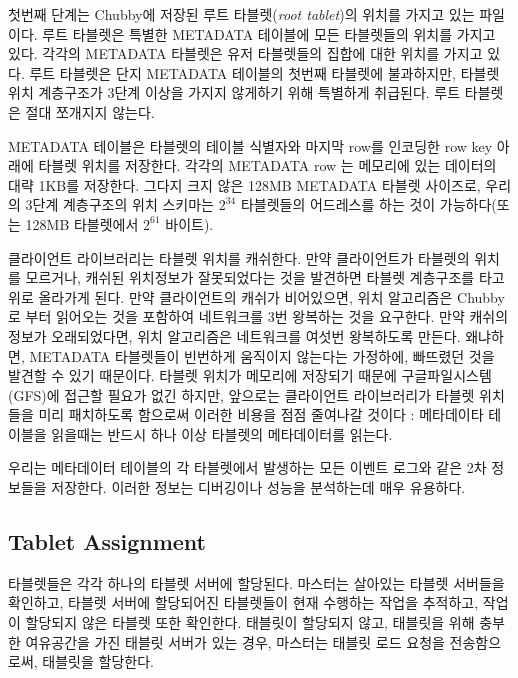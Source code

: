 \documentclass[twocolumn]{article}
\begin{document}
 첫번째 단계는 Chubby에 저장된 루트 타블렛(\textit{root tablet})의 위치를 가지고 있는 파일이다. 루트 타블렛은 특별한 METADATA 테이블에 모든 타블렛들의 위치를 가지고 있다. 각각의 METADATA 타블렛은 유저 타블렛들의 집합에 대한 위치를 가지고 있다. 루트 타블렛은 단지 METADATA 테이블의 첫번째 타블렛에 불과하지만, 타블렛 위치 계층구조가 3단계 이상을 가지지 않게하기 위해 특별하게 취급된다. 루트 타블렛은 절대 쪼개지지 않는다.

METADATA 테이블은 타블렛의 테이블 식별자와 마지막 row를 인코딩한 row key 아래에 타블렛 위치를 저장한다. 각각의 METADATA row 는 메모리에 있는 데이터의 대략 1KB를 저장한다. 그다지 크지 않은 128MB METADATA 타블렛 사이즈로, 우리의 3단계 계층구조의 위치 스키마는 $2^{34}$ 타블렛들의 어드레스를 하는 것이 가능하다(또는 128MB 타블렛에서 $2^{61}$ 바이트).

클라이언트 라이브러리는 타블렛 위치를 캐쉬한다. 만약 클라이언트가 타블렛의 위치를 모르거나, 캐쉬된 위치정보가 잘못되었다는 것을 발견하면 타블렛 계층구조를 타고 위로 올라가게 된다. 만약 클라이언트의 캐쉬가 비어있으면, 위치 알고리즘은 Chubby로 부터 읽어오는 것을 포함하여 네트워크를 3번 왕복하는 것을 요구한다. 만약 캐쉬의 정보가 오래되었다면, 위치 알고리즘은 네트워크를 여섯번 왕복하도록 만든다. 왜냐하면, METADATA 타블렛들이 빈번하게 움직이지 않는다는 가정하에, 빠뜨렸던 것을 발견할 수 있기 때문이다.  타블렛 위치가 메모리에 저장되기 때문에 구글파일시스템(GFS)에 접근할 필요가 없긴 하지만, 앞으로는 클라이언트 라이브러리가 타블렛 위치들을 미리 패치하도록 함으로써 이러한 비용을 점점 줄여나갈 것이다 : 메타데이타 테이블을 읽을때는 반드시 하나 이상 타블렛의 메타데이터를 읽는다.

우리는 메타데이터 테이블의 각 타블렛에서 발생하는 모든 이벤트 로그와 같은 2차 정보들을 저장한다. 이러한 정보는 디버깅이나 성능을 분석하는데 매우 유용하다.
 
\subsection{Tablet Assignment}
타블렛들은 각각 하나의 타블렛 서버에 할당된다. 마스터는 살아있는 타블렛 서버들을 확인하고, 타블렛 서버에 할당되어진 타블렛들이 현재 수행하는 작업을 추적하고, 작업이 할당되지 않은 타블렛 또한 확인한다. 태블릿이 할당되지 않고, 태블릿을 위해 충부한 여유공간을 가진 태블릿 서버가 있는 경우, 마스터는 태블릿 로드 요청을 전송함으로써, 태블릿을 할당한다. 
\end{document}
